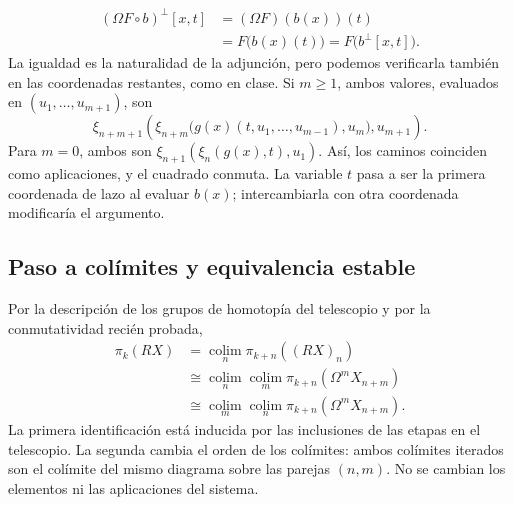 \[
\begin{aligned}
(\Omega F\circ b)^{\perp}[x,t]
&=(\Omega F)(b(x))(t)\\
&=F\bigl(b(x)(t)\bigr)
=F\bigl(b^{\perp}[x,t]\bigr).
\end{aligned}
\]
La igualdad es la naturalidad de la adjunción, pero podemos verificarla también en las coordenadas restantes, como en clase. Si $m\ge1$, ambos valores, evaluados en $(u_1,\ldots,u_{m+1})$, son
\[
\xi_{n+m+1}\!\left(
\xi_{n+m}\bigl(g(x)(t,u_1,\ldots,u_{m-1}),u_m\bigr),
u_{m+1}\right).
\]
Para $m=0$, ambos son $\xi_{n+1}(\xi_n(g(x),t),u_1)$. Así, los caminos coinciden como aplicaciones, y el cuadrado conmuta. La variable $t$ pasa a ser la primera coordenada de lazo al evaluar $b(x)$; intercambiarla con otra coordenada modificaría el argumento.

\subsection{Paso a colímites y equivalencia estable}

Por la descripción de los grupos de homotopía del telescopio y por la conmutatividad recién probada,
\[
\begin{aligned}
\pi_k(RX)
&=\operatorname*{colim}_n\pi_{k+n}((RX)_n)\\
&\cong\operatorname*{colim}_n\operatorname*{colim}_m
\pi_{k+n}(\Omega^mX_{n+m})\\
&\cong\operatorname*{colim}_m\operatorname*{colim}_n
\pi_{k+n}(\Omega^mX_{n+m}).
\end{aligned}
\]
La primera identificación está inducida por las inclusiones de las etapas en el telescopio. La segunda cambia el orden de los colímites: ambos colímites iterados son el colímite del mismo diagrama sobre las parejas $(n,m)$. No se cambian los elementos ni las aplicaciones del sistema.

